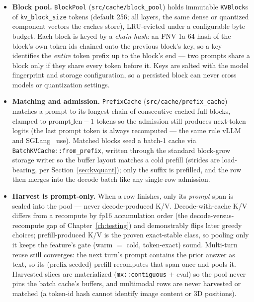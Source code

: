 \documentclass[11pt,a4paper]{report}
\newcommand{\code}[1]{\texttt{#1}}
\begin{document}
\begin{itemize}[nosep]
  \item \textbf{Block pool.} \code{BlockPool} (\code{src/cache/block\_pool})
        holds immutable \code{KVBlock}s of \code{kv\_block\_size} tokens (default
        256; all layers, the same dense or quantized component vectors the caches
        store), LRU-evicted under a configurable byte budget. Each block is keyed
        by a \emph{chain hash}: an FNV-1a-64 hash of the block's own token ids
        chained onto the previous block's key, so a key identifies the
        \emph{entire} token prefix up to the block's end --- two prompts share a
        block only if they share every token before it. Keys are salted with the
        model fingerprint and storage configuration, so a persisted block can
        never cross models or quantization settings.
  \item \textbf{Matching and admission.} \code{PrefixCache}
        (\code{src/cache/prefix\_cache}) matches a prompt to its longest chain of
        consecutive cached full blocks, clamped to $\text{prompt\_len}-1$ tokens
        so the admission still produces next-token logits (the last prompt token
        is always recomputed --- the same rule vLLM and
        SGLang~\citep{zheng2024sglang} use). Matched blocks seed a batch-1 cache
        via \code{BatchKVCache::from\_prefix}, written through the standard
        block-grow storage writer so the buffer layout matches a cold prefill
        (strides are load-bearing, per Section~\ref{sec:kvquant}); only the
        suffix is prefilled, and the row then merges into the decode batch like
        any single-row admission.
  \item \textbf{Harvest is prompt-only.} When a row finishes, only its
        \emph{prompt} span is sealed into the pool --- never decode-produced K/V.
        Decode-with-cache K/V differs from a recompute by fp16 accumulation order
        (the decode-versus-recompute gap of Chapter~\ref{ch:testing}) and
        demonstrably flips later greedy choices; prefill-produced K/V is the
        proven exact-stable class, so pooling only it keeps the feature's gate
        (warm $=$ cold, token-exact) sound. Multi-turn reuse still converges:
        the next turn's prompt contains the prior answer as text, so its
        (prefix-seeded) prefill recomputes that span once and pools it. Harvested
        slices are materialized (\code{mx::contiguous} $+$ eval) so the pool
        never pins the batch cache's buffers, and multimodal rows are never
        harvested or matched (a token-id hash cannot identify image content or
        3D positions).
\end{itemize}
\end{document}
